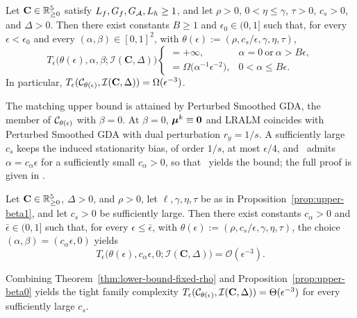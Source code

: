 \begin{theorem}
\label{thm:lower-bound-fixed-rho}
Let \(\mathbf C\in\mathbb{R}^5_{\ge0}\) satisfy \(L_f,G_f,G_{\mathcal{A}},L_h\ge1\),
and let \(\rho>0\), \(0<\eta\le\gamma\), \(\tau>0\), \(c_s>0\), and
\(\Delta>0\). Then there exist constants \(B\ge1\) and
\(\epsilon_0\in(0,1]\) such that, for every
\(\epsilon<\epsilon_0\) and every \((\alpha,\beta)\in[0,1]^2\), with
\(\theta(\epsilon):=(\rho,c_s/\epsilon,\gamma,\eta,\tau)\),
\[
    T_\epsilon\bigl(\theta(\epsilon),\alpha,\beta;\mathcal I(\mathbf C,\Delta)\bigr)
    \begin{cases}
        =+\infty, & \alpha=0\ \text{or}\ \alpha>B\epsilon,\\[2pt]
        =\Omega\bigl(\alpha^{-1}\epsilon^{-2}\bigr), & 0<\alpha\le B\epsilon.
    \end{cases}
\]
In particular,
\(T_\epsilon(\mathcal{C}_{\theta(\epsilon)},\mathcal I(\mathbf C,\Delta))=\Omega(\epsilon^{-3})\).
\end{theorem}
\noindent The matching upper bound is attained by Perturbed Smoothed
GDA, the member of \(\mathcal{C}_{\theta(\epsilon)}\) with
\(\beta=0\). At \(\beta=0\), \(\bm{\mu}^k\equiv\bm{0}\) and LRALM coincides
with Perturbed Smoothed GDA with dual perturbation \(r_y=1/s\). A sufficiently
large \(c_s\) keeps the induced stationarity bias, of order \(1/s\), at most
\(\epsilon/4\), and~\cite[Condition~3.2(ii)]{li2026smoothing} admits
\(\alpha=c_\alpha\epsilon\) for a sufficiently small \(c_\alpha>0\), so
that~\cite[Theorem~3.3(i)]{li2026smoothing} yields the bound; the full proof
is given in .

\begin{proposition}
\label{prop:upper-beta0}
Let \(\mathbf C\in\mathbb{R}^5_{\ge0}\), \(\Delta>0\), and \(\rho>0\), let
\(\ell,\gamma,\eta,\tau\) be as in Proposition~\ref{prop:upper-beta1}, and let
\(c_s>0\) be sufficiently large. Then there exist constants \(c_\alpha>0\)
and \(\bar\epsilon\in(0,1]\) such that, for every \(\epsilon\le\bar\epsilon\), with
\(\theta(\epsilon):=(\rho,c_s/\epsilon,\gamma,\eta,\tau)\), the choice
\((\alpha,\beta)=(c_\alpha\epsilon,0)\) yields
\[
    T_\epsilon\bigl(\theta(\epsilon),c_\alpha\epsilon,0;\mathcal I(\mathbf C,\Delta)\bigr)
    =\mathcal O(\epsilon^{-3}).
\]
\end{proposition}
\noindent Combining Theorem~\ref{thm:lower-bound-fixed-rho} and
Proposition~\ref{prop:upper-beta0} yields the tight family complexity
\(T_\epsilon(\mathcal{C}_{\theta(\epsilon)},\mathcal I(\mathbf C,\Delta))
=\Theta(\epsilon^{-3})\) for every sufficiently large \(c_s\).

